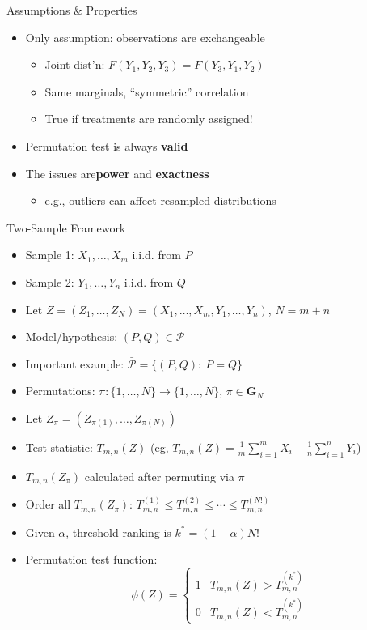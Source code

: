 \begin{frame}{Assumptions \& Properties}
    \begin{itemize}
        \item Only assumption: observations are exchangeable 
        \begin{itemize}
            \item Joint dist'n: $F(Y_1,Y_2,Y_3) = F(Y_3,Y_1,Y_2)$
            \item Same marginals, ``symmetric'' correlation
            \item True if treatments are randomly assigned!
        \end{itemize}
        \item Permutation test is always \textbf{valid}
        \item The issues are\textbf{power} and \textbf{exactness}
        \begin{itemize}
            \item e.g., outliers can affect resampled distributions
        \end{itemize}
    \end{itemize}
\end{frame}

\begin{frame}{Two-Sample Framework}
\citet{ChungRomano2013}
\begin{itemize}
    \item Sample 1: $X_1,\ldots,X_m$ i.i.d. from $P$
    \item Sample 2: $Y_1,\ldots,Y_n$ i.i.d. from $Q$
    \item Let $Z=(Z_1,\ldots,Z_N)=(X_1,\ldots,X_m,Y_1,\ldots,Y_n)$, $N=m+n$
    \item Model/hypothesis: $(P,Q)\in \mathcal{P}$
    \item Important example: $\bar{\mathcal{P}}=\{(P,Q):\ P=Q\}$
    \item Permutations: $\pi:\{1,\ldots,N\}\rightarrow \{1,\ldots,N\}$, $\pi\in \mathbf{G}_N$
    \item Let $Z_\pi = (Z_{\pi(1)},\ldots,Z_{\pi(N)})$
    \item Test statistic: $T_{m,n}(Z)$ (eg, $T_{m,n}(Z)=\frac{1}{m}\sum_{i=1}^m X_i - \frac{1}{n}\sum_{i=1}^n Y_i$)
    \item $T_{m,n}(Z_\pi)$ calculated after permuting via $\pi$
    \item Order all $T_{m,n}(Z_\pi)$: $T_{m,n}^{(1)}\leq T_{m,n}^{(2)}\leq \cdots \leq T_{m,n}^{(N!)}$
    \item Given $\alpha$, threshold ranking is $k^*=(1-\alpha)N!$
    \item Permutation test function:
    $$
        \phi(Z) = \begin{cases}
            1 & T_{m,n}(Z) > T_{m,n}^{(k^*)} \\
            0 & T_{m,n}(Z) < T_{m,n}^{(k^*)}
        \end{cases}
    $$
\end{itemize}
\end{frame}

